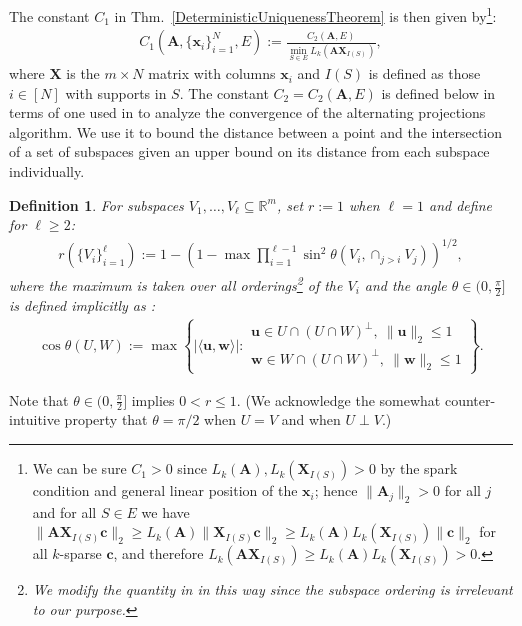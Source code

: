 \documentclass[9pt,twocolumn]{pnas-new}
\newtheorem{definition}{Definition}
\begin{document}
The constant $C_1$ in Thm.~\ref{DeterministicUniquenessTheorem} is then given by\footnote{We can be sure $C_1 > 0$ since $L_k(\mathbf{A}), L_k(\mathbf{X}_{I(S)}) > 0$ by the spark condition and general linear position of the $\mathbf{x}_i$; hence $\|\mathbf{A}_j\|_2 > 0$ for all $j$ and for all $S \in E$ we have $\|\mathbf{AX}_{I(S)}\mathbf{c}\|_2 \geq L_k(\mathbf{A})\|\mathbf{X}_{I(S)}\mathbf{c}\|_2 \geq L_k(\mathbf{A}) L_k(\mathbf{X}_{I(S)})\|\mathbf{c}\|_2$ for all $k$-sparse $\mathbf{c}$, and therefore $L_k(\mathbf{AX}_{I(S)}) \geq L_k(\mathbf{A}) L_k(\mathbf{X}_{I(S)}) > 0$.}:
\begin{align}\label{Cdef1}
C_1(\mathbf{A}, \{\mathbf{x}_i\}_{i=1}^N, E) := \frac{ C_2(\mathbf{A}, E) } { \min_{S \in E} L_k(\mathbf{AX}_{I(S)}) },
\end{align}
%
where $\mathbf{X}$ is the $m \times N$ matrix with columns $\mathbf{x}_i$ and $I(S)$ is defined as those $i \in [N]$ with supports in $S$. The constant $C_2 = C_2(\mathbf{A}, E)$ is defined below in terms of one used in \cite{Deutsch12} to analyze the convergence of the alternating projections algorithm.
We use it to bound the distance between a point and the intersection of a set of subspaces given an upper bound on its distance from each subspace individually.

\begin{definition}\label{SpecialSupportSet}\label{FriedrichsDefinition}
For subspaces $V_1, \ldots, V_\ell \subseteq \mathbb{R}^m$, set $r := 1$ when $\ell = 1$ and define for $\ell \geq 2$:
\begin{align*}
r(\{V_i\}_{i=1}^\ell) := 1 - \left(1 -  \max \prod_{i=1}^{\ell-1} \sin^2  \theta \left(V_i, \cap_{j>i} V_j \right)  \right)^{1/2},
\end{align*} 
%
where the maximum is taken over all orderings\footnote{We modify the quantity in \cite{Deutsch12} in this way since the subspace ordering is irrelevant to our purpose.} of the $V_i$ and the angle $\theta \in (0,\frac{\pi}{2}]$ is defined implicitly as \cite[Def.~9.4]{Deutsch12}:
\begin{align*}
\cos{\theta(U,W)} := \max\left\{ |\langle \mathbf{u}, \mathbf{w} \rangle|: \substack{ \mathbf{u} \in U \cap (U \cap W)^\perp, \ \|\mathbf{u}\|_2 \leq 1 \\ \mathbf{w} \in W \cap (U \cap W)^\perp, \  \|\mathbf{w}\|_2 \leq 1 } \right\}.
\end{align*}
\end{definition}
Note that $\theta \in (0,\frac{\pi}{2}]$ implies $0 < r \leq 1$. (We acknowledge the somewhat counter-intuitive property that $\theta =  \pi/2$ when $U = V$ and when $U \perp V$.)  %
\end{document}
